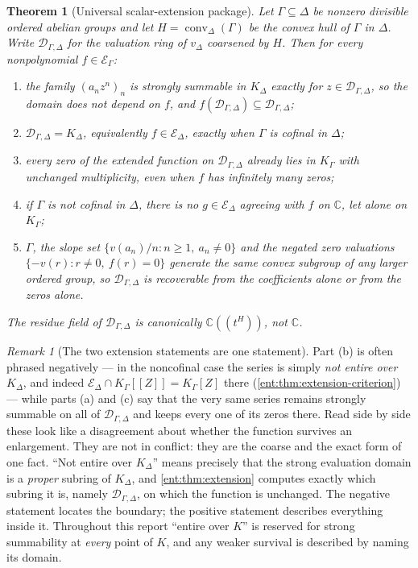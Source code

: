 \documentclass[11pt]{article}
\newtheorem{theorem}{Theorem}[section]
\theoremstyle{plain}
\theoremstyle{plain}
\theoremstyle{plain}
\theoremstyle{definition}
\theoremstyle{definition}
\theoremstyle{definition}
\theoremstyle{definition}
\theoremstyle{remark}
\newtheorem{remark}[remark]{Remark}
\newcommand{\C}{\mathbb C}\newcommand{\R}{\mathbb R}
\newcommand{\K}{K_\Gamma}\newcommand{\KD}{K_\Delta}
\newcommand{\E}{\mathcal E_\Gamma}
\newcommand{\Dom}{\mathcal D_{\Gamma,\Delta}}
\DeclareMathOperator{\conv}{conv}
\begin{document}
\begin{theorem}[Universal scalar-extension package]\label{ent:thm:main-extension}
Let $\Gamma\subseteq\Delta$ be nonzero divisible ordered abelian groups and
let $H=\conv_\Delta(\Gamma)$ be the convex hull of $\Gamma$ in $\Delta$.
Write $\Dom$ for the valuation ring of $v_\Delta$ coarsened by $H$. Then for
every \emph{nonpolynomial} $f\in\E$:
\begin{enumerate}[label=\textnormal{(\alph*)},leftmargin=2em]
\item the family $(a_nz^n)_n$ is strongly summable in $\KD$ exactly for
$z\in\Dom$, so the domain does not depend on $f$, and $f(\Dom)\subseteq\Dom$;
\item $\Dom=\KD$, equivalently $f\in\mathcal E_\Delta$, exactly when
$\Gamma$ is cofinal in $\Delta$;
\item every zero of the extended function on $\Dom$ already lies in $\K$
with unchanged multiplicity, even when $f$ has infinitely many zeros;
\item if $\Gamma$ is not cofinal in $\Delta$, there is no
$g\in\mathcal E_\Delta$ agreeing with $f$ on $\C$, let alone on $\K$;
\item $\Gamma$, the slope set $\{v(a_n)/n:n\ge1,\ a_n\ne0\}$ and the
negated zero valuations $\{-v(r):r\ne0,\ f(r)=0\}$ generate the same convex
subgroup of any larger ordered group,
so $\Dom$ is recoverable from the coefficients alone or from the zeros alone.
\end{enumerate}
The residue field of $\Dom$ is canonically $\C((t^H))$, not $\C$.
\end{theorem}

\begin{remark}[The two extension statements are one statement]
\label{ent:rem:conflict}
Part (b) is often phrased negatively --- in the noncofinal case the series
is simply \emph{not entire over} $\KD$, and indeed
$\mathcal E_\Delta\cap\K[[Z]]=\K[Z]$ there
(\cref{ent:thm:extension-criterion}) --- while parts (a) and (c) say that
the very same series remains strongly summable on all of $\Dom$ and keeps
every one of its zeros there. Read side by side these look like a
disagreement about whether the function survives an enlargement. They are
not in conflict: they are the coarse and the exact form of one fact. ``Not
entire over $\KD$'' means precisely that the strong evaluation domain is a
\emph{proper} subring of $\KD$, and \cref{ent:thm:extension} computes
exactly which subring it is, namely $\Dom$, on which the function is
unchanged. The negative statement locates the boundary; the positive
statement describes everything inside it. Throughout this report ``entire
over $K$'' is reserved for strong summability at \emph{every} point of $K$,
and any weaker survival is described by naming its domain.
\end{remark}
\end{document}
